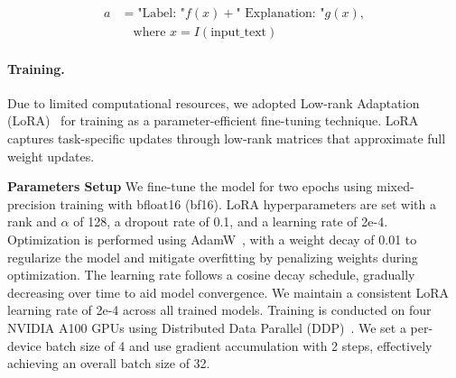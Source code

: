 \footnotesize
\begin{equation}
    \begin{aligned}
        a &= \text{"Label: "} f(x) + \text{" Explanation: "} g(x), \\
        &\quad \text{where } x = I(\text{input\_text})
    \end{aligned}
\end{equation}
\normalsize
\noindent
\paragraph{Training.}
Due to limited computational resources, we adopted Low-rank Adaptation (LoRA)~\cite{hu2021lora} for training as a parameter-efficient fine-tuning technique. LoRA captures task-specific updates through low-rank matrices that approximate full weight updates. %

\noindent
\textbf{Parameters Setup}  
We fine-tune the model for two epochs using mixed-precision training with bfloat16 (bf16). LoRA hyperparameters are set with a rank and \(\alpha\) of 128, a dropout rate of 0.1, and a learning rate of 2e-4. Optimization is performed using AdamW~\cite{loshchilov2017decoupled}, with a weight decay of 0.01 to regularize the model and mitigate overfitting by penalizing weights during optimization. The learning rate follows a cosine decay schedule, gradually decreasing over time to aid model convergence. We maintain a consistent LoRA learning rate of 2e-4 across all trained models. Training is conducted on four NVIDIA A100 GPUs using Distributed Data Parallel (DDP)~\cite{bai2022modern}. We set a per-device batch size of 4 and use gradient accumulation with 2 steps, effectively achieving an overall batch size of 32.

